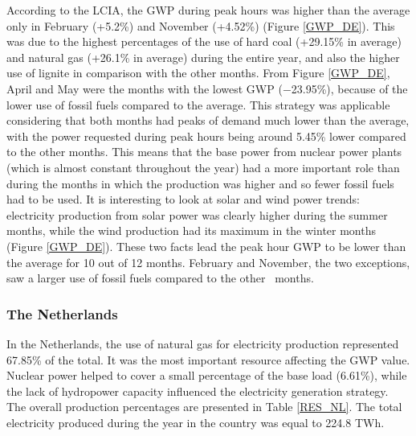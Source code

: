 {\newpage
According to the LCIA, the GWP during peak hours was higher than the average only in  February {(+5.2\%)} and November {(+4.52\%)} (Figure \ref{GWP_DE}). This was due to the highest percentages of the use of hard coal {(+29.15\% in average)} and natural gas {(+26.1\% in average)} during the entire year, and also the higher use of lignite in comparison with the other months. From Figure \ref{GWP_DE}, April and May were the months with the lowest GWP {($-$23.95\%)}, because of the lower use of fossil fuels compared to the average. This strategy was applicable considering that both months had peaks of demand much lower than the average, {with the power requested during peak hours being around 5.45\% lower compared to the other months}. This means that the base power from nuclear power plants (which is almost constant throughout the year) had a more important role than during the months in which the production was higher and so fewer fossil fuels had to be used. It is interesting to look at solar and wind power trends: electricity production from solar power was clearly higher during the summer months, while the wind production had its maximum in the winter months (Figure \ref{GWP_DE}). These two facts lead the peak hour GWP to be lower than the average  for 10 out of 12 months. February and November, the two exceptions, saw a larger use of fossil fuels compared to the {other}%
~months. 


\subsubsection{The Netherlands}

In the Netherlands, the use of natural gas for electricity production represented  67.85\% of the total. It was the most important resource affecting the GWP value. Nuclear power helped to cover a small percentage of the base load {(6.61\%)}, while the lack of hydropower capacity influenced the electricity generation strategy.  The overall production percentages are presented in Table \ref{RES_NL}.  The total electricity produced during the year in the country was equal to 224.8 TWh.

 \begin{table}[]
\centering
\caption{Percentage of resources used during peak and off-peak hours in the Netherlands \cite{Entso-eProduction}.}
\label{RES_NL}
\end{table}

}

